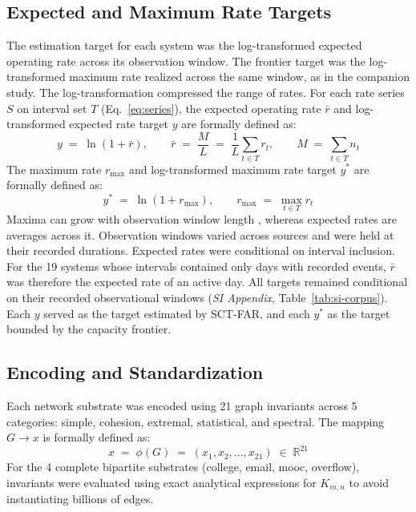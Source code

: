 \documentclass{article}
\begin{document}
\subsection*{Expected and Maximum Rate Targets}
The estimation target for each system was the log-transformed expected operating rate across its observation window. The frontier target was the log-transformed maximum rate realized across the same window, as in the companion study. The log-transformation compressed the range of rates. For each rate series $S$ on interval set $T$ (Eq.~\eqref{eq:series}), the expected operating rate $\bar{r}$ and log-transformed expected rate target $y$ are formally defined as:
\begin{equation}
    y \;=\; \ln\!\left(1 + \bar{r}\right),
    \qquad
    \bar{r} \;=\; \frac{M}{L} \;=\; \frac{1}{L}\sum_{t \in T} r_t,
    \qquad
    M \;=\; \sum_{t \in T} n_t
\label{eq:expected}
\end{equation}
The maximum rate $r_{\max}$ and log-transformed maximum rate target $y^*$ are formally defined as:
\begin{equation}
    y^{*} \;=\; \ln\!\left(1 + r_{\max}\right),
    \qquad
    r_{\max} \;=\; \max_{t \in T} r_t
\label{eq:maximum}
\end{equation}
Maxima can grow with observation window length \citep{ref58,ref59,ref60}, whereas expected rates are averages across it. Observation windows varied across sources and were held at their recorded durations. Expected rates were conditional on interval inclusion. For the 19 systems whose intervals contained only days with recorded events, $\bar{r}$ was therefore the expected rate of an active day. All targets remained conditional on their recorded observational windows (\textit{SI Appendix}, Table~\ref{tab:si-corpus}). Each $y$ served as the target estimated by SCT-FAR, and each $y^*$ as the target bounded by the capacity frontier.

\subsection*{Encoding and Standardization}
\label{sec:encoding}
Each network substrate was encoded using 21 graph invariants across 5 categories: simple, cohesion, extremal, statistical, and spectral. The mapping $G \to x$ is formally defined as:
\begin{equation}
    x \;=\; \phi(G) \;=\; (x_1, x_2, \ldots, x_{21}) \;\in\; \mathbb{R}^{21}
\label{eq:invariants}
\end{equation}
For the 4 complete bipartite substrates (college, email, mooc, overflow), invariants were evaluated using exact analytical expressions for $K_{m,n}$ to avoid instantiating billions of edges.
\end{document}

